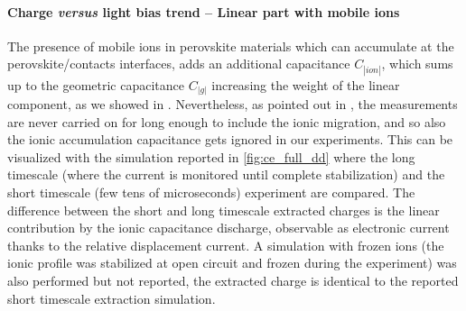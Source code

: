 		\paragraph{Charge \textsl{versus} light bias trend -- Linear part with mobile ions}
		The presence of mobile ions in perovskite materials which can accumulate at the perovskite/contacts interfaces, adds an additional capacitance $C_|ion|$, which sums up to the geometric capacitance $C_|g|$ increasing the weight of the linear component, as we showed in .
		Nevertheless, as pointed out in , the  measurements are never carried on for long enough to include the ionic migration, and so also the ionic accumulation capacitance gets ignored in our experiments.
		This can be visualized with the simulation reported in \cref{fig:ce_full_dd} where the long timescale (where the current is monitored until complete stabilization) and the short timescale (few tens of microseconds)  experiment are compared.
		The difference between the short and long timescale extracted charges is the linear contribution by the ionic capacitance discharge, observable as electronic current thanks to the relative displacement current.
		A simulation with frozen ions (the ionic profile was stabilized at open circuit and frozen during the  experiment) was also performed but not reported, the extracted charge is identical to the reported short timescale extraction simulation.
		
			\begin{figure}%
	\end{figure}


